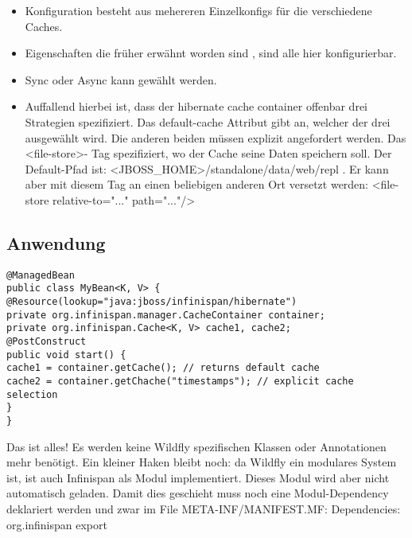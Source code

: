 \documentclass[a4paper,10pt]{scrreprt}
\begin{document}
\begin{itemize}
	\item Konfiguration besteht aus mehereren Einzelkonfigs für die verschiedene Caches. 
	\item Eigenschaften die früher erwähnt worden sind , sind alle hier konfigurierbar.
	\item Sync oder Async kann gewählt werden.
	\item Auffallend hierbei ist, dass der hibernate cache container offenbar drei Strategien spezifiziert. Das default-cache
Attribut gibt an, welcher der drei ausgewählt wird. Die anderen beiden müssen explizit angefordert werden.
Das <file-store>- Tag spezifiziert, wo der Cache seine Daten speichern soll. Der Default-Pfad ist:
<JBOSS\_HOME>/standalone/data/web/repl . Er kann aber mit diesem Tag an einen beliebigen anderen Ort
versetzt werden: <file-store relative-to="..." path="..."/>
\end{itemize}
\subsection{Anwendung} %
\label{sub:anwendung}
\begin{lstlisting}[caption=Anwendung Caching]
	@ManagedBean
public class MyBean<K, V> {
@Resource(lookup="java:jboss/infinispan/hibernate")
private org.infinispan.manager.CacheContainer container;
private org.infinispan.Cache<K, V> cache1, cache2;
@PostConstruct
public void start() {
cache1 = container.getCache(); // returns default cache
cache2 = container.getChache("timestamps"); // explicit cache selection
}
}
\end{lstlisting}
Das ist alles! Es werden keine Wildfly spezifischen Klassen oder Annotationen mehr benötigt. Ein kleiner Haken
bleibt noch: da Wildfly ein modulares System ist, ist auch Infinispan als Modul implementiert. Dieses Modul
wird aber nicht automatisch geladen. Damit dies geschieht muss noch eine Modul-Dependency deklariert
werden und zwar im File META-INF/MANIFEST.MF:
Dependencies: org.infinispan export
\end{document}

